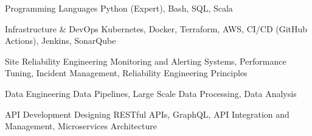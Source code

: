 


\begin{cvskills}


\cvskill
{Programming Languages} %
{Python (Expert), Bash, SQL, Scala} %


\cvskill
{Infrastructure \& DevOps} %
{Kubernetes, Docker, Terraform, AWS, CI/CD (GitHub Actions), Jenkins, SonarQube} %


\cvskill
{Site Reliability Engineering} %
{Monitoring and Alerting Systems, Performance Tuning, Incident Management, Reliability Engineering Principles} %


\cvskill
{Data Engineering} %
{Data Pipelines, Large Scale Data Processing, Data Analysis} %


\cvskill
{API Development} %
{Designing RESTful APIs, GraphQL, API Integration and Management, Microservices Architecture} %


\end{cvskills}
